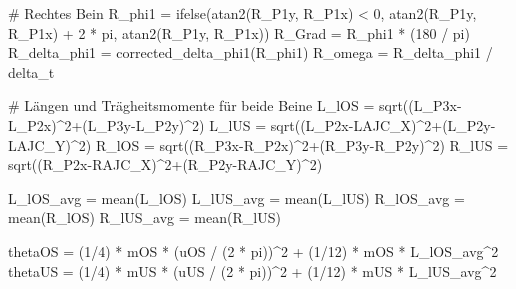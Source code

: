 \documentclass[
  letterpaper,
  DIV=11]{scrartcl}
\newenvironment{Shaded}{\begin{snugshade}}{\end{snugshade}}
\newcommand{\CommentTok}[1]{\textcolor[rgb]{0.37,0.37,0.37}{#1}}
\newcommand{\DecValTok}[1]{\textcolor[rgb]{0.68,0.00,0.00}{#1}}
\newcommand{\FunctionTok}[1]{\textcolor[rgb]{0.28,0.35,0.67}{#1}}
\newcommand{\NormalTok}[1]{\textcolor[rgb]{0.00,0.23,0.31}{#1}}
\newcommand{\OtherTok}[1]{\textcolor[rgb]{0.00,0.23,0.31}{#1}}
\newcommand{\SpecialCharTok}[1]{\textcolor[rgb]{0.37,0.37,0.37}{#1}}
\begin{document}
\begin{Shaded}
\begin{Highlighting}[]
\CommentTok{\# Rechtes Bein}
\NormalTok{R\_phi1 }\OtherTok{=} \FunctionTok{ifelse}\NormalTok{(}\FunctionTok{atan2}\NormalTok{(R\_P1y, R\_P1x) }\SpecialCharTok{\textless{}} \DecValTok{0}\NormalTok{, }\FunctionTok{atan2}\NormalTok{(R\_P1y, R\_P1x) }\SpecialCharTok{+} \DecValTok{2} \SpecialCharTok{*}\NormalTok{ pi, }\FunctionTok{atan2}\NormalTok{(R\_P1y, R\_P1x))}
\NormalTok{R\_Grad }\OtherTok{=}\NormalTok{ R\_phi1 }\SpecialCharTok{*}\NormalTok{ (}\DecValTok{180} \SpecialCharTok{/}\NormalTok{ pi)}
\NormalTok{R\_delta\_phi1 }\OtherTok{=} \FunctionTok{corrected\_delta\_phi1}\NormalTok{(R\_phi1)}
\NormalTok{R\_omega }\OtherTok{=}\NormalTok{ R\_delta\_phi1 }\SpecialCharTok{/}\NormalTok{ delta\_t}

\CommentTok{\# Längen und Trägheitsmomente für beide Beine}
\NormalTok{L\_lOS }\OtherTok{=} \FunctionTok{sqrt}\NormalTok{((L\_P3x}\SpecialCharTok{{-}}\NormalTok{L\_P2x)}\SpecialCharTok{\^{}}\DecValTok{2}\SpecialCharTok{+}\NormalTok{(L\_P3y}\SpecialCharTok{{-}}\NormalTok{L\_P2y)}\SpecialCharTok{\^{}}\DecValTok{2}\NormalTok{)}
\NormalTok{L\_lUS }\OtherTok{=} \FunctionTok{sqrt}\NormalTok{((L\_P2x}\SpecialCharTok{{-}}\NormalTok{LAJC\_X)}\SpecialCharTok{\^{}}\DecValTok{2}\SpecialCharTok{+}\NormalTok{(L\_P2y}\SpecialCharTok{{-}}\NormalTok{LAJC\_Y)}\SpecialCharTok{\^{}}\DecValTok{2}\NormalTok{)}
\NormalTok{R\_lOS }\OtherTok{=} \FunctionTok{sqrt}\NormalTok{((R\_P3x}\SpecialCharTok{{-}}\NormalTok{R\_P2x)}\SpecialCharTok{\^{}}\DecValTok{2}\SpecialCharTok{+}\NormalTok{(R\_P3y}\SpecialCharTok{{-}}\NormalTok{R\_P2y)}\SpecialCharTok{\^{}}\DecValTok{2}\NormalTok{)}
\NormalTok{R\_lUS }\OtherTok{=} \FunctionTok{sqrt}\NormalTok{((R\_P2x}\SpecialCharTok{{-}}\NormalTok{RAJC\_X)}\SpecialCharTok{\^{}}\DecValTok{2}\SpecialCharTok{+}\NormalTok{(R\_P2y}\SpecialCharTok{{-}}\NormalTok{RAJC\_Y)}\SpecialCharTok{\^{}}\DecValTok{2}\NormalTok{)}

\NormalTok{L\_lOS\_avg }\OtherTok{=} \FunctionTok{mean}\NormalTok{(L\_lOS)}
\NormalTok{L\_lUS\_avg }\OtherTok{=} \FunctionTok{mean}\NormalTok{(L\_lUS)}
\NormalTok{R\_lOS\_avg }\OtherTok{=} \FunctionTok{mean}\NormalTok{(R\_lOS)}
\NormalTok{R\_lUS\_avg }\OtherTok{=} \FunctionTok{mean}\NormalTok{(R\_lUS)}

\NormalTok{thetaOS }\OtherTok{=}\NormalTok{ (}\DecValTok{1}\SpecialCharTok{/}\DecValTok{4}\NormalTok{) }\SpecialCharTok{*}\NormalTok{ mOS }\SpecialCharTok{*}\NormalTok{ (uOS }\SpecialCharTok{/}\NormalTok{ (}\DecValTok{2} \SpecialCharTok{*}\NormalTok{ pi))}\SpecialCharTok{\^{}}\DecValTok{2} \SpecialCharTok{+}\NormalTok{ (}\DecValTok{1}\SpecialCharTok{/}\DecValTok{12}\NormalTok{) }\SpecialCharTok{*}\NormalTok{ mOS }\SpecialCharTok{*}\NormalTok{ L\_lOS\_avg}\SpecialCharTok{\^{}}\DecValTok{2}
\NormalTok{thetaUS }\OtherTok{=}\NormalTok{ (}\DecValTok{1}\SpecialCharTok{/}\DecValTok{4}\NormalTok{) }\SpecialCharTok{*}\NormalTok{ mUS }\SpecialCharTok{*}\NormalTok{ (uUS }\SpecialCharTok{/}\NormalTok{ (}\DecValTok{2} \SpecialCharTok{*}\NormalTok{ pi))}\SpecialCharTok{\^{}}\DecValTok{2} \SpecialCharTok{+}\NormalTok{ (}\DecValTok{1}\SpecialCharTok{/}\DecValTok{12}\NormalTok{) }\SpecialCharTok{*}\NormalTok{ mUS }\SpecialCharTok{*}\NormalTok{ L\_lUS\_avg}\SpecialCharTok{\^{}}\DecValTok{2}


\end{Highlighting}
\end{Shaded}
\end{document}
